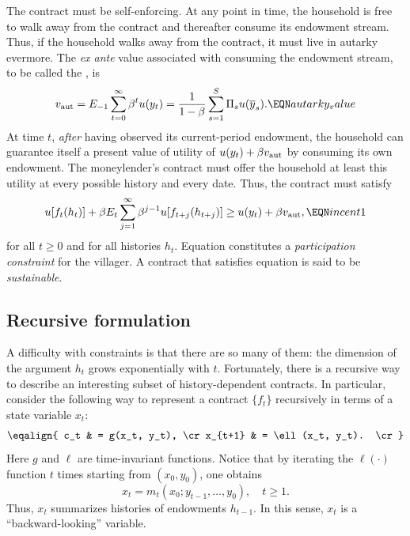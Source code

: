   The contract must be self-enforcing.  At any point in time, the
household is free to walk away from the contract and thereafter consume
its endowment stream.  Thus, if the household walks away from the contract,
it must live in autarky evermore.  The {\it ex ante\/} value associated
with consuming the endowment stream, to be called the , is
$$ v_{\rm aut} = E_{-1} \sum_{t=0}^\infty \beta^t u(y_t) =
 {1 \over 1-\beta}\sum_{s=1}^S \Pi_s u(\overline y_s).       \EQN autarky_value $$
%
At  time $t$, {\it after\/} having observed its current-period endowment,
the household can guarantee itself a present value of utility of
$u(y_t) + \beta v_{\rm aut}$ by consuming its own endowment.  The
moneylender's contract must offer the household at least this utility
at every possible history and every date.  Thus, the contract must
satisfy
$$  u[f_t(h_t)] + \beta E_t \sum_{j=1}^\infty \beta^{j-1} u[f_{t+j} (h_{t+j})]
    \geq u(y_t) + \beta v_{\rm aut} , \EQN incent1 $$
for all $t \geq 0$ and for all histories $h_t$.  Equation
 constitutes a   %
{\it participation constraint\/} for the villager.  A contract that
satisfies equation  is said to be {\it sustainable}.

\subsection{Recursive formulation}

 A difficulty with constraints   is
that there are so many of them: the dimension of the argument
$h_t$ grows  exponentially with $t$. Fortunately,
 there is a recursive way to describe an interesting subset of history-dependent contracts.
In particular, consider the following way to represent a contract $\{f_t\}$
recursively in terms of a state variable $x_t$:
$$\eqalign{ c_t & = g(x_t, y_t), \cr
            x_{t+1} & = \ell(x_t, y_t). \cr}$$
Here $g$ and $\ell$ are time-invariant functions.
Notice that by iterating the $\ell(\cdot)$ function $t$ times
starting from $(x_0, y_0)$, one obtains
$$ x_t = m_t(x_0; y_{t-1}, \ldots , y_0), \quad t \geq 1. $$
Thus, $x_t$ summarizes histories of endowments $h_{t-1}$.  In this sense,
$x_t$ is a ``backward-looking'' variable.

